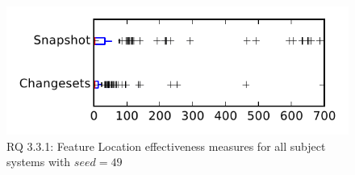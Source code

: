 
\begin{figure}
\centering
\includegraphics[height=0.4\textheight]{figures/flt_seed/rq1_tiny_49}
\caption{RQ 3.3.1: Feature Location effectiveness measures for all subject systems with $seed=49$}
\label{fig:flt_seed:rq1:tiny}
\end{figure}
